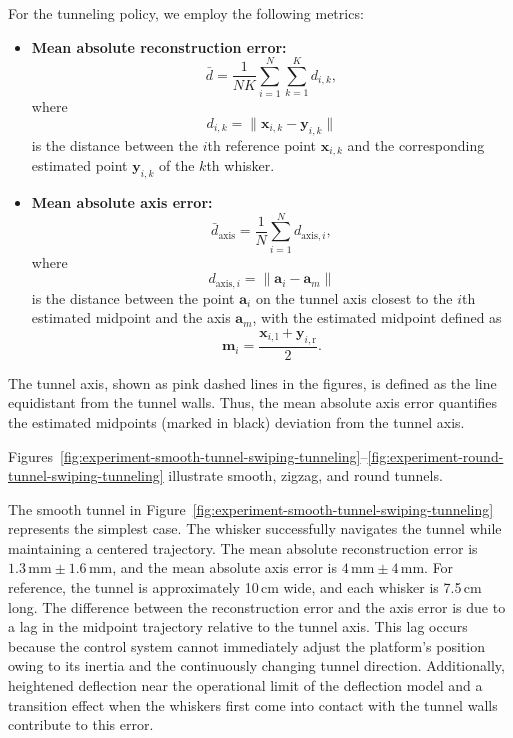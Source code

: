 For the tunneling policy, we employ the following metrics:

\begin{itemize}
    \item \textbf{Mean absolute reconstruction error:}
    \[
        \bar{d} = \frac{1}{NK}\sum_{i=1}^{N}\sum_{k=1}^{K} d_{i,k},
    \]
    where
    \[
        d_{i,k} = \|\mathbf{x}_{i,k} - \mathbf{y}_{i,k}\|
    \]
    is the distance between the $i$th reference point $\mathbf{x}_{i,k}$ and the corresponding estimated point $\mathbf{y}_{i,k}$ of the $k$th whisker.
    \item \textbf{Mean absolute axis error:}
    \[
        \bar{d}_{\mathrm{axis}} = \frac{1}{N}\sum_{i=1}^{N} d_{\mathrm{axis},i},
    \]
    where
    \[
        d_{\mathrm{axis},i} = \|\mathbf{a}_i - \mathbf{a}_m\|
    \]
    is the distance between the point $\mathbf{a}_i$ on the tunnel axis closest to the $i$th estimated midpoint and the axis $\mathbf{a}_m$, with the estimated midpoint defined as
    \[
        \mathbf{m}_i = \frac{\mathbf{x}_{i,\mathrm{l}} + \mathbf{y}_{i,\mathrm{r}}}{2}.
    \]
\end{itemize}

The tunnel axis, shown as pink dashed lines in the figures, is defined as the line equidistant from the tunnel walls.
Thus, the mean absolute axis error quantifies the estimated midpoints (marked in black) deviation from the tunnel axis.

Figures~\ref{fig:experiment-smooth-tunnel-swiping-tunneling}--\ref{fig:experiment-round-tunnel-swiping-tunneling} illustrate smooth, zigzag, and round tunnels.

The smooth tunnel in Figure~\ref{fig:experiment-smooth-tunnel-swiping-tunneling} represents the simplest case.
The whisker successfully navigates the tunnel while maintaining a centered trajectory.
The mean absolute reconstruction error is $1.3\,\text{mm} \pm 1.6\,\text{mm}$, and the mean absolute axis error is $4\,\text{mm} \pm 4\,\text{mm}$.
For reference, the tunnel is approximately 10\,cm wide, and each whisker is 7.5\,cm long.
The difference between the reconstruction error and the axis error is due to a lag in the midpoint trajectory relative to the tunnel axis.
This lag occurs because the control system cannot immediately adjust the platform's position owing to its inertia and the continuously changing tunnel direction.
Additionally, heightened deflection near the operational limit of the deflection model and a transition effect when the whiskers first come into contact with the tunnel walls contribute to this error.

